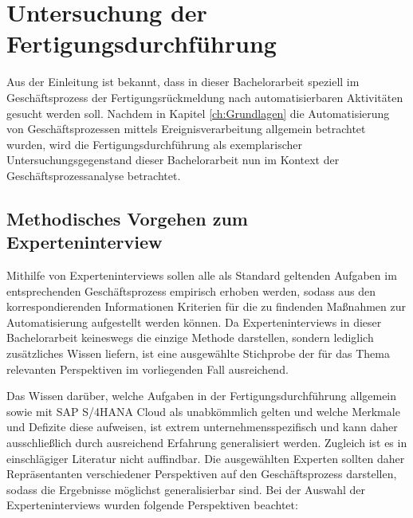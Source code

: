 \section{Untersuchung der Fertigungsdurchführung}\label{sec:untersuchung}


Aus der Einleitung ist bekannt, dass in dieser Bachelorarbeit speziell im Geschäftsprozess der Fertigungsrückmeldung nach automatisierbaren Aktivitäten gesucht werden soll. 
Nachdem in Kapitel \ref{ch:Grundlagen} die Automatisierung von Geschäftsprozessen mittels Ereignisverarbeitung allgemein betrachtet wurden, wird die Fertigungsdurchführung als exemplarischer Untersuchungsgegenstand dieser Bachelorarbeit nun im Kontext der Geschäftsprozessanalyse betrachtet. 

\subsection{Methodisches Vorgehen zum Experteninterview}

Mithilfe von Experteninterviews sollen alle als Standard geltenden Aufgaben im entsprechenden Geschäftsprozess empirisch erhoben werden, sodass aus den korrespondierenden Informationen Kriterien für die zu findenden Maßnahmen zur Automatisierung aufgestellt werden können. 
Da Experteninterviews in dieser Bachelorarbeit keineswegs die einzige Methode darstellen, sondern lediglich zusätzliches Wissen liefern, ist eine ausgewählte Stichprobe der für das Thema relevanten Perspektiven im vorliegenden Fall ausreichend.

Das Wissen darüber, welche Aufgaben in der Fertigungsdurchführung allgemein sowie mit SAP S/4HANA Cloud als unabkömmlich gelten und welche Merkmale und Defizite diese aufweisen, ist extrem unternehmensspezifisch und kann daher ausschließlich durch ausreichend Erfahrung generalisiert werden. 
Zugleich ist es in einschlägiger Literatur nicht auffindbar.
Die ausgewählten Experten sollten daher Repräsentanten verschiedener Perspektiven auf den Geschäftsprozess darstellen, sodass die Ergebnisse möglichst generalisierbar sind. 
Bei der Auswahl der Experteninterviews wurden folgende Perspektiven beachtet:


